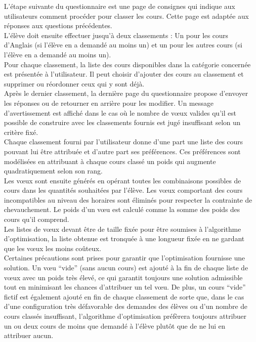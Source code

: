 \documentclass[12pt]{article}
\begin{document}
L'étape suivante du questionnaire est une page de consignes qui indique aux utilisateurs comment procéder pour classer les cours. Cette page est adaptée aux réponses aux questions précédentes. \\

L'élève doit ensuite effectuer jusqu’à deux classements : Un pour les cours d’Anglais (si l’élève en a demandé au moins un) et un pour les autres cours (si l’élève en a demandé au moins un). \\

Pour chaque classement, la liste des cours disponibles dans la catégorie concernée est présentée à l’utilisateur. Il peut choisir d’ajouter des cours au classement et supprimer ou réordonner ceux qui y sont déjà. \\

Après le dernier classement, la dernière page du questionnaire propose d’envoyer les réponses ou de retourner en arrière pour les modifier. Un message d’avertissement est affiché dans le cas où le nombre de vœux valides qu’il est possible de construire avec les classements fournis est jugé insuffisant selon un critère fixé.  \\

Chaque classement fourni par l’utilisateur donne d’une part une liste des cours pouvant lui être attribuée et d’autre part ses préférences. Ces préférences sont modélisées en attribuant à chaque cours classé un poids qui augmente quadratiquement selon son rang. \\

Les vœux sont ensuite générés en opérant toutes les combinaisons possibles de cours dans les quantités souhaitées par l’élève. Les vœux comportant des cours incompatibles au niveau des horaires sont éliminés pour respecter la contrainte de chevauchement. Le poids d’un vœu est calculé comme la somme des poids des cours qu’il comprend. \\

Les listes de vœux devant être de taille fixée pour être soumises à l’algorithme d’optimisation, la liste obtenue est tronquée à une longueur fixée en ne gardant que les vœux les moins coûteux.  \\

Certaines précautions sont prises pour garantir que l’optimisation fournisse une solution. Un vœu “vide” (sans aucun cours) est ajouté à la fin de chaque liste de vœux avec un poids très élevé, ce qui garantit toujours une solution admissible tout en minimisant les chances d’attribuer un tel vœu. De plus, un cours “vide” fictif est également ajouté en fin de chaque classement de sorte que, dans le cas d’une configuration très défavorable des demandes des élèves ou d’un nombre de cours classés insuffisant, l’algorithme d’optimisation préfèrera toujours attribuer un ou deux cours de moins que demandé à l’élève plutôt que de ne lui en attribuer aucun. \\
\end{document}
